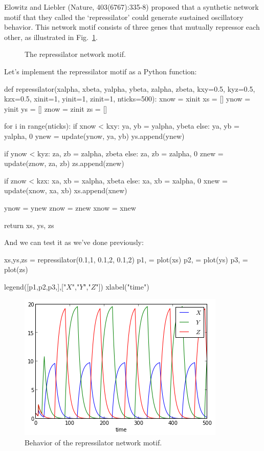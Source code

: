 Elowitz and Liebler (Nature, 403(6767):335-8) proposed that a synthetic network motif that they called the `repressilator' could generate sustained oscillatory behavior. This network motif consists of three genes that mutually repressor each other, as illustrated in Fig.~\ref{fig:repressilator}.
\begin{figure}[!ht]
\centering
{}
\caption{The repressilator network motif.}\label{fig:repressilator}
\end{figure}
%
Let's implement the repressilator motif as a Python function:
\begin{python}
def repressilator(xalpha, xbeta, yalpha, ybeta, zalpha, zbeta, kxy=0.5, kyz=0.5, kzx=0.5, xinit=1, yinit=1, zinit=1, nticks=500):
    xnow = xinit
    xs = []
    ynow = yinit
    ys = []
    znow = zinit
    zs = []

    for i in range(nticks):
        if xnow < kxy:
            ya, yb = yalpha, ybeta
        else:
            ya, yb = yalpha, 0
        ynew = update(ynow, ya, yb)
        ys.append(ynew)

        if ynow < kyz:
            za, zb = zalpha, zbeta
        else:
            za, zb = zalpha, 0
        znew = update(znow, za, zb)
        zs.append(znew)

        if znow < kzx:
            xa, xb = xalpha, xbeta
        else:
            xa, xb = xalpha, 0
        xnew = update(xnow, xa, xb)
        xs.append(xnew)

        ynow = ynew
        znow = znew
        xnow = xnew

    return xs, ys, zs
\end{python}
%
And we can test it as we've done previously:
\begin{python}
xs,ys,zs = repressilator(0.1,1, 0.1,2, 0.1,2)
p1, = plot(xs)
p2, = plot(ys)
p3, = plot(zs)

legend([p1,p2,p3,],["$X$","$Y$","$Z$"])
xlabel("time")
\end{python}
%
\begin{figure}[!ht]
    \centering
    \includegraphics[width=0.33\columnwidth]{./figures/hands-on12/fig-repressilator.png}
    \caption{Behavior of the repressilator network motif.}\label{fig:repressdynamics}
\end{figure}



